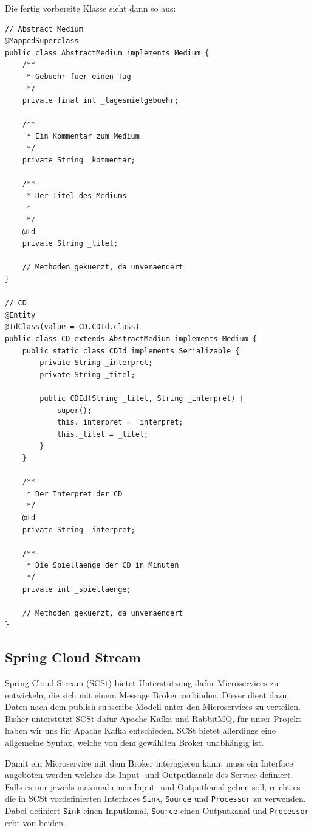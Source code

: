 \documentclass{article}
\begin{document}
Die fertig vorbereite Klasse sieht dann so aus:

\begin{lstlisting}
// Abstract Medium
@MappedSuperclass
public class AbstractMedium implements Medium {
    /**
     * Gebuehr fuer einen Tag
     */
    private final int _tagesmietgebuehr;

    /**
     * Ein Kommentar zum Medium
     */
    private String _kommentar;

    /**
     * Der Titel des Mediums
     *
     */
    @Id
    private String _titel;

    // Methoden gekuerzt, da unveraendert
}

// CD
@Entity
@IdClass(value = CD.CDId.class)
public class CD extends AbstractMedium implements Medium {
    public static class CDId implements Serializable {
        private String _interpret;
        private String _titel;

        public CDId(String _titel, String _interpret) {
            super();
            this._interpret = _interpret;
            this._titel = _titel;
        }
    }

    /**
     * Der Interpret der CD
     */
    @Id
    private String _interpret;

    /**
     * Die Spiellaenge der CD in Minuten
     */
    private int _spiellaenge;

    // Methoden gekuerzt, da unveraendert
}
\end{lstlisting}

\subsection{Spring Cloud Stream}

Spring Cloud Stream (SCSt) bietet Unterstützung dafür Microservices zu entwickeln, die sich mit einem Message Broker verbinden.
Dieser dient dazu, Daten nach dem publish-subscribe-Modell unter den Microservices zu verteilen.
Bisher unterstützt SCSt dafür Apache Kafka und RabbitMQ, für unser Projekt haben wir uns für Apache Kafka entschieden.
SCSt bietet allerdings eine allgemeine Syntax, welche von dem gewählten Broker unabhängig ist.

Damit ein Microservice mit dem Broker interagieren kann, muss ein Interface angeboten werden welches die Input- und Outputkanäle des Service definiert.
Falls es nur jeweils maximal einen Input- und Outputkanal geben soll, reicht es die in SCSt vordefinierten Interfaces \texttt{Sink}, \texttt{Source} und \texttt{Processor} zu verwenden.
Dabei definiert \texttt{Sink} einen Inputkanal, \texttt{Source} einen Outputkanal und \texttt{Processor} erbt von beiden.
\end{document}
